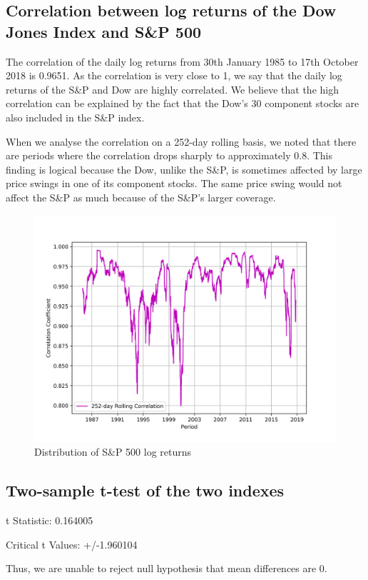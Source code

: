 \documentclass[a4paper]{article}
\begin{document}
	\subsection{Correlation between log returns of the Dow Jones Index and S\&P 500}
	The correlation of the daily log returns from 30th January 1985 to 17th October 2018 is 0.9651. As the correlation is very close to 1, we say that the daily log returns of the S\&P and Dow are highly correlated. We believe that the high correlation can be explained by the fact that the Dow’s 30 component stocks are also included in the S\&P index. 
	
	When we analyse the correlation on a 252-day rolling basis, we noted that there are periods where the correlation drops sharply to approximately 0.8. This finding is logical because the Dow, unlike the S\&P, is sometimes affected by large price swings in one of its component stocks. The same price swing would not affect the S\&P as much because of the S\&P’s larger coverage. 
	
	\begin{figure}[h!]
		\centering
		\includegraphics[width=0.8\linewidth]{correlation.png}
		\caption{Distribution of S\&P 500 log returns}
	\end{figure}
	
	\newpage
	\subsection{Two-sample t-test of the two indexes}
	\begin{flushleft}
		t Statistic: 0.164005
		
		Critical t Values: +/-1.960104
		
		Thus, we are unable to reject null hypothesis that mean differences are 0.
	\end{flushleft}
	
\end{document}
